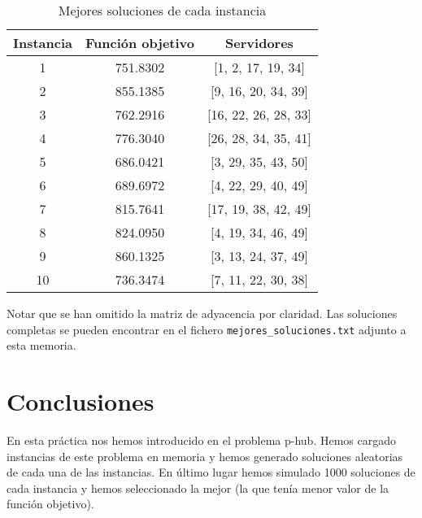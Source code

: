 \documentclass[11pt,a4paper,twoside,openright,titlepage,final]{article}
\begin{document}
\begin{table}[htbp!]
	\centering
	\caption{Mejores soluciones de cada instancia}
	\label{tbl:mejores}
	\begin{tabular}{@{}ccc@{}}
		\toprule
		Instancia & Función objetivo & Servidores               \\ \midrule
		1         & 751.8302         & {[}1, 2, 17, 19, 34{]}   \\
		2         & 855.1385         & {[}9, 16, 20, 34, 39{]}  \\
		3         & 762.2916         & {[}16, 22, 26, 28, 33{]} \\
		4         & 776.3040         & {[}26, 28, 34, 35, 41{]} \\
		5         & 686.0421         & {[}3, 29, 35, 43, 50{]}  \\
		6         & 689.6972         & {[}4, 22, 29, 40, 49{]}  \\
		7         & 815.7641         & {[}17, 19, 38, 42, 49{]} \\
		8         & 824.0950         & {[}4, 19, 34, 46, 49{]}  \\
		9         & 860.1325         & {[}3, 13, 24, 37, 49{]}  \\
		10        & 736.3474         & {[}7, 11, 22, 30, 38{]}  \\ \bottomrule
	\end{tabular}
\end{table}

Notar que se han omitido la matriz de adyacencia por claridad. Las soluciones completas se pueden encontrar en el fichero \texttt{mejores\_soluciones.txt} adjunto a esta memoria.


\section{Conclusiones}

En esta práctica nos hemos introducido en el problema p-hub. Hemos cargado instancias de este problema en memoria y hemos generado soluciones aleatorias de cada una de las instancias. En último lugar hemos simulado 1000 soluciones de cada instancia y hemos seleccionado la mejor (la que tenía menor valor de la función objetivo).
\end{document}
